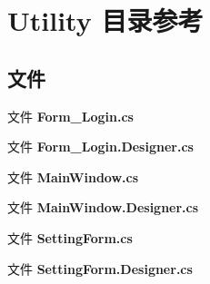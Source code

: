 \section{Utility 目录参考}
\label{dir_45512b4d464edf1241bf27d9b61f7c89}
\subsection*{文件}
\begin{DoxyCompactItemize}
\item 
文件 \textbf{ Form\+\_\+\+Login.\+cs}
\item 
文件 \textbf{ Form\+\_\+\+Login.\+Designer.\+cs}
\item 
文件 \textbf{ Main\+Window.\+cs}
\item 
文件 \textbf{ Main\+Window.\+Designer.\+cs}
\item 
文件 \textbf{ Setting\+Form.\+cs}
\item 
文件 \textbf{ Setting\+Form.\+Designer.\+cs}
\end{DoxyCompactItemize}
